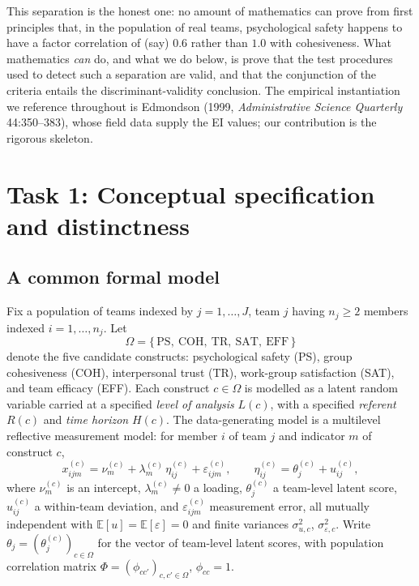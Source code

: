 \documentclass{amsart}
\theoremstyle{remark}
\begin{document}
This separation is the honest one: no amount of mathematics can prove from first
principles that, in the population of real teams, psychological safety happens to
have a factor correlation of (say) $0.6$ rather than $1.0$ with cohesiveness. What
mathematics \emph{can} do, and what we do below, is prove that the test procedures
used to detect such a separation are valid, and that the conjunction of the
criteria entails the discriminant-validity conclusion. The empirical instantiation
we reference throughout is Edmondson (1999, \emph{Administrative Science
Quarterly} 44:350--383), whose field data supply the EI values; our contribution
is the rigorous skeleton.

\section{Task 1: Conceptual specification and distinctness}\label{sec:concept}

\subsection{A common formal model}
Fix a population of teams indexed by $j=1,\dots,J$, team $j$ having $n_j\ge 2$
members indexed $i=1,\dots,n_j$. Let
\[
\Omega=\{\,\text{PS},\ \text{COH},\ \text{TR},\ \text{SAT},\ \text{EFF}\,\}
\]
denote the five candidate constructs: psychological safety (PS), group
cohesiveness (COH), interpersonal trust (TR), work-group satisfaction (SAT), and
team efficacy (EFF). Each construct $c\in\Omega$ is modelled as a latent random
variable carried at a specified \emph{level of analysis} $L(c)$, with a specified
\emph{referent} $R(c)$ and \emph{time horizon} $H(c)$. The data-generating model is
a multilevel reflective measurement model: for member $i$ of team $j$ and
indicator $m$ of construct $c$,
\begin{equation}\label{eq:cfa}
x^{(c)}_{ijm}=\nu^{(c)}_m+\lambda^{(c)}_m\,\eta^{(c)}_{ij}+\varepsilon^{(c)}_{ijm},
\qquad
\eta^{(c)}_{ij}=\theta^{(c)}_{j}+u^{(c)}_{ij},
\end{equation}
where $\nu^{(c)}_m$ is an intercept, $\lambda^{(c)}_m\neq0$ a loading,
$\theta^{(c)}_{j}$ a team-level latent score, $u^{(c)}_{ij}$ a within-team
deviation, and $\varepsilon^{(c)}_{ijm}$ measurement error, all mutually
independent with $\mathbb{E}[u]=\mathbb{E}[\varepsilon]=0$ and finite variances
$\sigma^2_{u,c}$, $\sigma^2_{\varepsilon,c}$. Write $\theta_j=(\theta^{(c)}_j)_{c\in\Omega}$
for the vector of team-level latent scores, with population correlation matrix
$\Phi=(\phi_{cc'})_{c,c'\in\Omega}$, $\phi_{cc}=1$.
\end{document}
